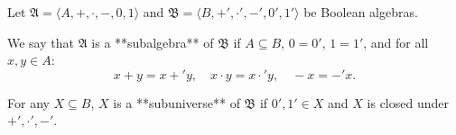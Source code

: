 Let $\mathfrak{A} = \langle A, +, \cdot, -, 0, 1 \rangle$ and $\mathfrak{B} = \langle B, +', \cdot', -', 0', 1' \rangle$ be Boolean algebras.

We say that $\mathfrak{A}$ is a **subalgebra** of $\mathfrak{B}$ if $A \subseteq B$, $0 = 0'$, $1 = 1'$, and for all $x, y \in A$:
$$x + y = x +' y, \quad x \cdot y = x \cdot' y, \quad -x = -' x.$$

For any $X \subseteq B$, $X$ is a **subuniverse** of $\mathfrak{B}$ if $0', 1' \in X$ and $X$ is closed under $+', \cdot', -'$.
